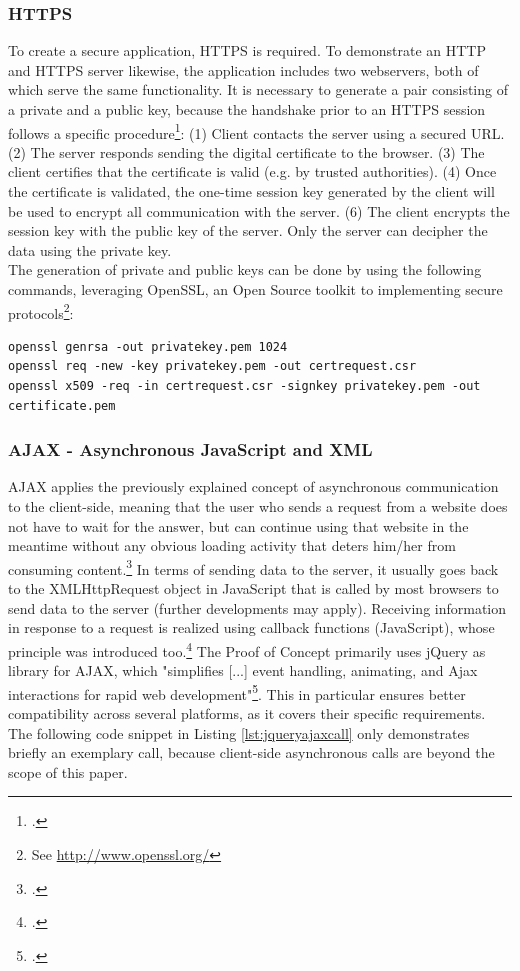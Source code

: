 \subsubsection{HTTPS}
To create a secure application, HTTPS is required. To demonstrate an HTTP and
HTTPS server likewise, the application includes two webservers, both of which
serve the same functionality. It is necessary to generate a pair consisting of a
private and a public key, because the handshake prior to an HTTPS session
follows a specific procedure\footcite[Cf.][]{Nemati_2011}:
 (1) Client contacts the server using a secured URL.
 (2) The server responds sending the digital certificate to the browser.
 (3) The client certifies that the certificate is valid (e.g. by trusted
 authorities).
 (4) Once the certificate is validated, the one-time session key generated by
 the client will be used to encrypt all communication with the server.
 (6) The client encrypts the session key with the public key of the server. Only
 the server can decipher the data using the private key.\\
The generation of private and public keys can be done by using the following
commands, leveraging OpenSSL, an Open Source toolkit to implementing secure
protocols\footnote{See \url{ http://www.openssl.org/}}:\\

\begin{lstlisting}[caption={Generating a new pair of public/private keys}]
openssl genrsa -out privatekey.pem 1024
openssl req -new -key privatekey.pem -out certrequest.csr 
openssl x509 -req -in certrequest.csr -signkey privatekey.pem -out certificate.pem
\end{lstlisting}

\subsubsection{AJAX - Asynchronous JavaScript and XML}
AJAX applies the previously explained concept of asynchronous communication to
the client-side, meaning that the user who sends a request from a website does
not have to wait for the answer, but can continue using that website in the
meantime without any obvious loading activity that deters him/her from consuming
content.\footcite[Cf.][46]{riordan2008head} In terms of sending data to the
server, it usually goes back to the XMLHttpRequest object in JavaScript that is
called by most browsers to send data to the server (further developments may
apply). Receiving information in response to a request is realized using
callback functions (JavaScript), whose principle was introduced
too.\footcite[Cf.][21]{riordan2008head} The Proof of Concept primarily uses
jQuery as library for AJAX, which "simplifies [...] event handling, animating,
and Ajax interactions for rapid web development"\footcite[Cf.][]{jquery2013}.
This in particular ensures better compatibility across several platforms, as it
covers their specific requirements. The following code snippet in Listing
\ref{lst:jqueryajaxcall} only demonstrates briefly an exemplary call, because
client-side asynchronous calls are beyond the scope of this paper.

